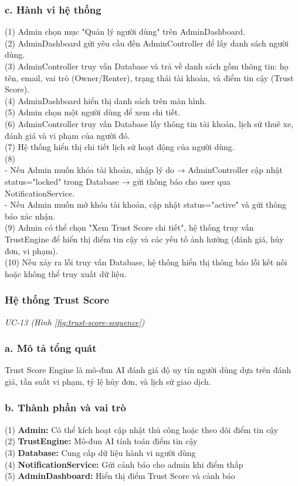 \subsubsection*{c. Hành vi hệ thống}
(1) Admin chọn mục "Quản lý người dùng" trên AdminDashboard. \\
(2) AdminDashboard gửi yêu cầu đến AdminController để lấy danh sách người dùng. \\
(3) AdminController truy vấn Database và trả về danh sách gồm thông tin: họ tên, email, vai trò (Owner/Renter), trạng thái tài khoản, và điểm tin cậy (Trust Score). \\
(4) AdminDashboard hiển thị danh sách trên màn hình. \\
(5) Admin chọn một người dùng để xem chi tiết. \\
(6) AdminController truy vấn Database lấy thông tin tài khoản, lịch sử thuê xe, đánh giá và vi phạm của người đó. \\
(7) Hệ thống hiển thị chi tiết lịch sử hoạt động của người dùng. \\
(8) \\
\quad - Nếu Admin muốn khóa tài khoản, nhập lý do → AdminController cập nhật status="locked" trong Database → gửi thông báo cho user qua NotificationService. \\
\quad - Nếu Admin muốn mở khóa tài khoản, cập nhật status="active" và gửi thông báo xác nhận. \\
(9) Admin có thể chọn "Xem Trust Score chi tiết", hệ thống truy vấn TrustEngine để hiển thị điểm tin cậy và các yếu tố ảnh hưởng (đánh giá, hủy đơn, vi phạm). \\
(10) Nếu xảy ra lỗi truy vấn Database, hệ thống hiển thị thông báo lỗi kết nối hoặc không thể truy xuất dữ liệu.
\subsubsection{Hệ thống Trust Score}
\small\textit{UC-13 (Hình \ref{fig:trust-score-sequence})}
\subsubsection*{a. Mô tả tổng quát}
Trust Score Engine là mô-đun AI đánh giá độ uy tín người dùng dựa trên đánh giá, tần suất vi phạm, tỷ lệ hủy đơn, và lịch sử giao dịch.
\subsubsection*{b. Thành phần và vai trò}
(1) \textbf{Admin:} Có thể kích hoạt cập nhật thủ công hoặc theo dõi điểm tin cậy \\
(2) \textbf{TrustEngine:} Mô-đun AI tính toán điểm tin cậy \\
(3) \textbf{Database:} Cung cấp dữ liệu hành vi người dùng \\
(4) \textbf{NotificationService:} Gửi cảnh báo cho admin khi điểm thấp \\
(5) \textbf{AdminDashboard:} Hiển thị điểm Trust Score và cảnh báo
